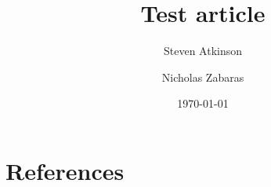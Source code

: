 \documentclass[12pt]{article}
\begin{document}
\begin{frontmatter}

\title{Test article}
\author[ad1]{Steven Atkinson}
\author[ad1]{Nicholas Zabaras}
\address[ad1]{
    Center for Informatics and Computational Science \\ 
    University of Notre Dame \\
    311 I Cushing Hall, 
    Notre Dame, IN 46556, USA
}
\date{\today}
\end{frontmatter}



\section*{References}

\end{document}

